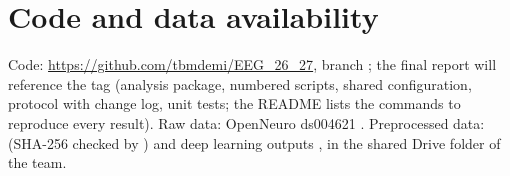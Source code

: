 \section{Code and data availability}
\label{ch:availability}

Code: \url{https://github.com/tbmdemi/EEG_26_27}, branch ; the final report will reference the tag  (analysis package, numbered scripts, shared configuration, protocol with change log, unit tests; the README lists the commands to reproduce every result). Raw data: OpenNeuro ds004621 \citep{dzianok2022data}. Preprocessed data:  (SHA-256 checked by ) and deep learning outputs , in the shared Drive folder of the team.
